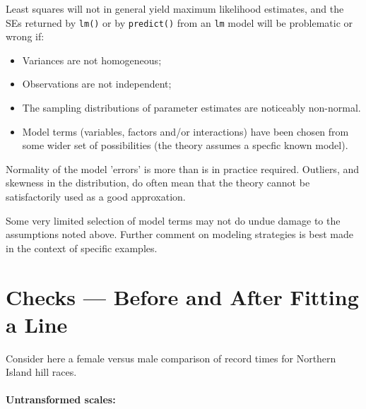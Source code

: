 \documentclass{tufte-book}\usepackage[]{graphicx}\usepackage[]{color}
\begin{document}
Least squares will not in general yield maximum likelihood estimates,
and the SEs returned by \texttt{lm()} or by \texttt{predict()} from
an \texttt{lm} model will be problematic or wrong if:
\begin{itemize}
\item Variances are not homogeneous;
    \item Observations are not independent;
    \item The sampling distributions of parameter estimates are
      noticeably non-normal.
    \item Model terms (variables, factors and/or interactions) have
      been chosen from some wider set of possibilities (the theory
      assumes a specfic known model).
 \end{itemize}

 Normality of the model 'errors' is more than is in practice required.
 Outliers, and skewness in the distribution, do often mean that the
 theory cannot be satisfactorily used as a good approxation.

 Some very limited selection of model terms may not do undue damage to
 the assumptions noted above.  Further comment on modeling strategies
 is best made in the context of specific examples.

\section{Checks --- Before and After Fitting a Line}

Consider here a female versus male comparison of record times for
Northern Island hill races.

\paragraph{Untransformed scales:}
\end{document}
